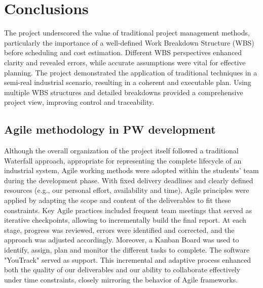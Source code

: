 \section{Conclusions}
The project underscored the value of traditional project management methods, particularly the importance of a well-defined Work Breakdown Structure (WBS) before scheduling and cost estimation. Different WBS perspectives enhanced clarity and revealed errors, while accurate assumptions were vital for effective planning.
The project demonstrated the application of traditional techniques in a semi-real industrial scenario, resulting in a coherent and executable plan. Using multiple WBS structures and detailed breakdowns provided a comprehensive project view, improving control and traceability.


\subsection{Agile methodology in PW development}
Although the overall organization of the project itself followed a traditional Waterfall approach, appropriate for representing the complete lifecycle of an industrial system, Agile working methods were adopted within the students' team during the development phase.
With fixed delivery deadlines and clearly defined resources (e.g., our personal effort, availability and time), Agile principles were applied by adapting the scope and content of the deliverables to fit these constraints. Key Agile practices included frequent team meetings that served as iterative checkpoints, allowing to incrementally build the final report.
At each stage, progress was reviewed, errors were identified and corrected, and the approach was adjusted accordingly.
Moreover, a Kanban Board was used to identify, assign, plan and monitor the different tasks to complete. The software "YouTrack" served as support.
This incremental and adaptive process enhanced both the quality of our deliverables and our ability to collaborate effectively under time constraints, closely mirroring the behavior of Agile frameworks.

